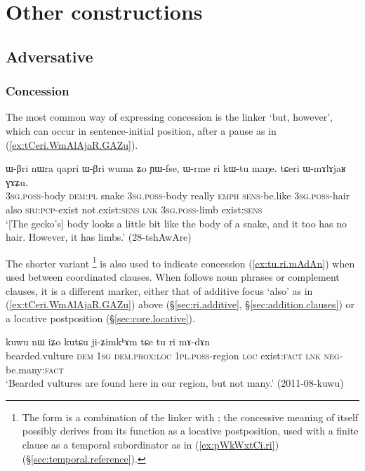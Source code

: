 \section{Other constructions}
 
\subsection{Adversative} \label{sec:adversative.clauses}

\subsubsection{Concession} \label{sec:concessive.clauses}
The most common way of expressing concession is the linker  `but, however', which can occur in sentence-initial position, after a pause as in (\ref{ex:tCeri.WmAlAjaR.GAZu}).

\begin{exe}
\ex \label{ex:tCeri.WmAlAjaR.GAZu}
\gll ɯ-βri nɯra qapri ɯ-βri wuma ʑo ɲɯ-fse, ɯ-rme ri kɯ-tu maŋe. tɕeri ɯ-mɤlɤjaʁ ɣɤʑu. \\
\textsc{3sg}.\textsc{poss}-body \textsc{dem}:\textsc{pl} snake \textsc{3sg}.\textsc{poss}-body really \textsc{emph} \textsc{sens}-be.like \textsc{3sg}.\textsc{poss}-hair also \textsc{sbj}:\textsc{pcp}-exist not.exist:\textsc{sens} \textsc{lnk} \textsc{3sg}.\textsc{poss}-limb exist:\textsc{sens} \\
\glt `[The gecko's] body looks a little bit like the body of a snake, and it too has no hair. However, it has limbs.' (28-tshAwAre)
\end{exe}  

The shorter variant \footnote{The form  is a combination of the linker  with ; the concessive meaning of  itself possibly derives from its function as a locative postposition, used with a finite clause as a temporal subordinator as in (\ref{ex:pWkWxtCi.ri}) (§\ref{sec:temporal.reference}). } is also used to indicate concession (\ref{ex:tu.ri.mAdAn}) when used between coordinated clauses. When  follows noun phrases or complement clauses, it is a different marker, either that of additive focus `also' as in (\ref{ex:tCeri.WmAlAjaR.GAZu}) above (§\ref{sec:ri.additive}, §\ref{sec:addition.clauses}) or a locative postposition (§\ref{sec:core.locative}).

\begin{exe}
\ex \label{ex:tu.ri.mAdAn}
\gll kuwu nɯ iʑo kutɕu ji-ʑimkʰɤm tɕe tu ri mɤ-dɤn \\
bearded.vulture \textsc{dem} \textsc{1sg} \textsc{dem}.\textsc{prox}:\textsc{loc} \textsc{1pl}.\textsc{poss}-region \textsc{loc} exist:\textsc{fact} \textsc{lnk} \textsc{neg}-be.many:\textsc{fact} \\
\glt `Bearded vultures are found here in our region, but not many.' (2011-08-kuwu)
\end{exe}  
 
